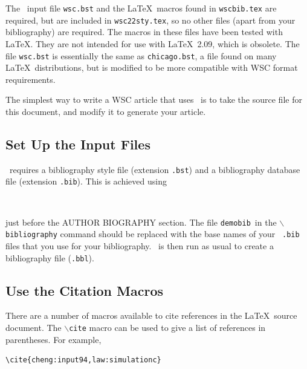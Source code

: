 \documentclass{article}
\begin{document}
The \BibTeX\ input file {\tt wsc.bst} and the \LaTeX\ macros found in {\tt wscbib.tex} are required, but are included in {\tt wsc22sty.tex}, so no other files (apart from your bibliography) are required.
The macros in these files have been tested with \LaTeX. They are not intended for use with \LaTeX\ 2.09, which is obsolete.
The file {\tt wsc.bst} is essentially the same as {\tt chicago.bst}, a file found on many \LaTeX\ distributions, but is
modified to be more compatible with WSC format requirements.

The simplest way to write a WSC article that uses \BibTeX\ is to take the source file for this document, and modify it to generate your article. %

\subsection{Set Up the \texorpdfstring{\BibTeX}{BibTex} Input Files}

\BibTeX\ requires a bibliography style file (extension \texttt{.bst}) and a bibliography database file (extension \texttt{.bib}). This is achieved
using\newline


\begin{verbatim}


\end{verbatim}\vspace{5mm}

\noindent just before the AUTHOR BIOGRAPHY section. The file {\tt demobib}\ in the {\tt $\backslash$bibliography} command should be replaced with the base names of your \BibTeX\ {\tt *.bib} files that you use for your bibliography. \BibTeX\ is then run as usual to create a bibliography file ({\tt *.bbl}).

\subsection{Use the Citation Macros}
There are a number of macros available to cite references in the \LaTeX\ source document. The {\tt $\backslash$cite} macro can be used to give a list of references in parentheses. For example,\newline

\begin{verbatim}
\cite{cheng:input94,law:simulationc}
\end{verbatim}\vspace{5mm}
\end{document}
